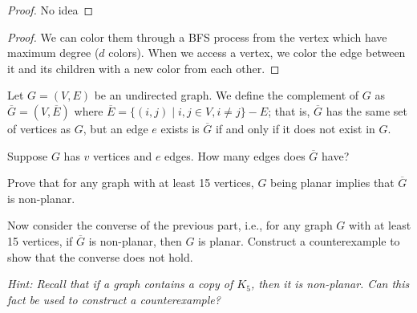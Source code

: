\documentclass[11pt]{article}
\begin{document}
\begin{solution}
\begin{Parts}
    \Part
    \begin{center}
    \end{center}
    \Part
    \begin{proof}
        No idea
    \end{proof}
    \Part
    \begin{proof}
        We can color them through a BFS process from the vertex which have maximum degree ($d$ colors).
        When we access a vertex, we color the edge between it and its children with a new color from each other.
    \end{proof}
\end{Parts}
\end{solution}






Let $G = (V, E)$ be an undirected graph.  We define the complement of $G$ as $\overline{G} = (V, \overline{E})$ where $\overline{E} = \{(i,j) \mid i,j \in V, i \neq j\} - E$; that is, $\overline{G}$ has the same set of vertices as $G$, but an edge $e$ exists is $\overline{G}$ if and only if it does not exist in $G$.

\begin{Parts}

\Part Suppose $G$ has $v$ vertices and $e$ edges.  How many edges does $\overline{G}$ have?


\Part Prove that for any graph with at least 15 vertices, $G$ being planar implies that $\overline{G}$ is non-planar.


\Part Now consider the converse of the previous part, i.e., for any graph $G$ with at least 15 vertices, if $\overline{G}$ is non-planar, then $G$ is planar. Construct a counterexample to show that the converse does not hold.

\textit{Hint: Recall that if a graph contains a copy of $K_5$, then it is non-planar. Can this fact be used to construct a counterexample?}


\end{Parts}
\end{document}
